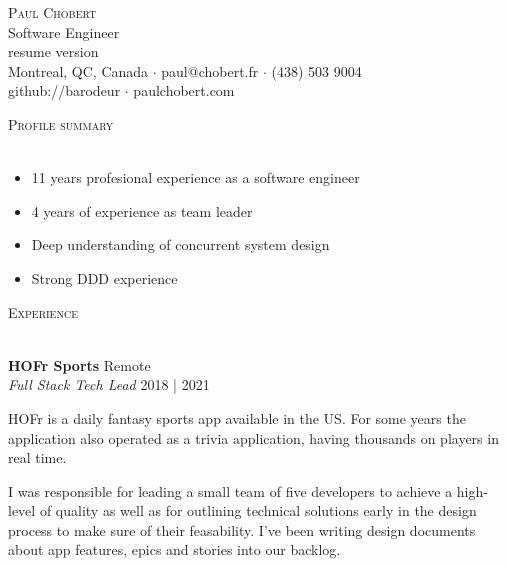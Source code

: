 \documentclass[a4paper]{article}
\newcommand{\lineunder} {
    \vspace*{-8pt} \\
    \hspace*{-18pt} \hrulefill \\
}
\newcommand{\header} [1] {
    {\hspace*{-18pt}\vspace*{6pt} \textsc{#1}}
    \vspace*{-6pt} \lineunder
}
\begin{document}
\vspace*{-40pt}

\vspace*{-10pt}
\begin{center}
    {\Huge \scshape {Paul Chobert}}\\
    Software Engineer\\
    \ifx\empty\gitsha
    \else
        {\small resume version \href{https://github.com/barodeur/resume/tree/\gitsha}{}}\\
    \fi
    Montreal, QC, Canada $\cdot$ paul@chobert.fr $\cdot$ (438) 503 9004\\
    github://barodeur $\cdot$ paulchobert.com
\end{center}

\vspace*{2mm}

\header{Profile summary}
\vspace{1mm}

\vspace{-1mm}
\begin{itemize} \itemsep 1pt
    \item 11 years profesional experience as a software engineer
    \item 4 years of experience as team leader
    \item Deep understanding of concurrent system design
    \item Strong DDD experience
\end{itemize}
\vspace{-1mm}

\header{Experience}
\vspace{1mm}

\textbf{HOFr Sports} \hfill Remote\\
\textit{Full Stack Tech Lead} \hfill 2018 | 2021\\
\vspace{2mm}

HOFr is a daily fantasy sports app available in the US. For some years the application also operated as
a trivia application, having thousands on players in real time.

I was responsible for leading a small team of five developers to achieve a high-level of quality as well as
for outlining technical solutions early in the design process to make sure of their feasability.
I've been writing design documents about app features, epics and stories into our backlog.
\end{document}
